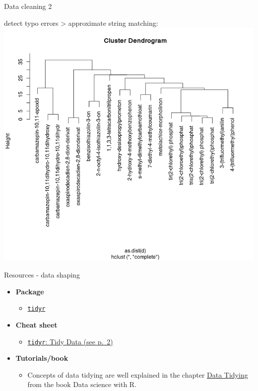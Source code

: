 \documentclass[9pt,ignorenonframetext,]{beamer}
\providecommand{\tightlist}{%
  \setlength{\itemsep}{0pt}\setlength{\parskip}{0pt}}
\begin{document}
\begin{frame}{Data cleaning 2}

detect typo errors \textgreater{} approximate string matching:
\includegraphics{imgPres/data_cleaning_dendrogram.png}

\end{frame}

\begin{frame}[fragile]{Resources - data shaping}

\begin{itemize}
\tightlist
\item
  \textbf{Package}

  \begin{itemize}
  \tightlist
  \item
    \href{https://cran.r-project.org/web/packages/tidyr/index.html}{\texttt{tidyr}}
  \end{itemize}
\item
  \textbf{Cheat sheet}

  \begin{itemize}
  \tightlist
  \item
    \href{https://github.com/rstudio/cheatsheets/raw/master/data-import.pdf}{\texttt{tidyr}:
    Tidy Data (see p.~2)}
  \end{itemize}
\item
  \textbf{Tutorials/book}

  \begin{itemize}
  \tightlist
  \item
    Concepts of data tidying are well explained in the chapter
    \href{http://garrettgman.github.io/tidying/}{Data Tidying} from the
    book Data science with R.
  \end{itemize}
\end{itemize}

\end{frame}
\end{document}
